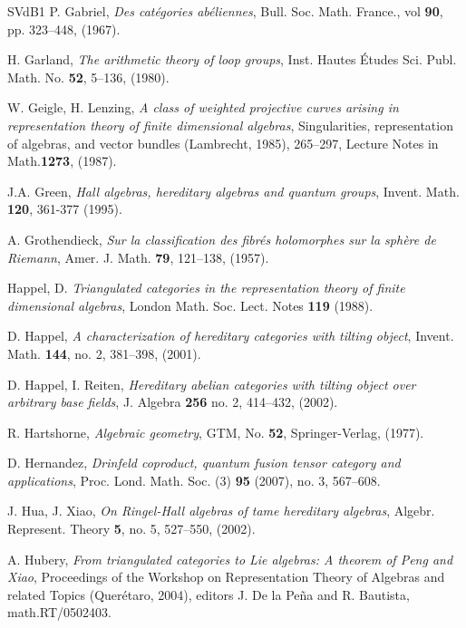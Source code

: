 \documentclass[a4paper,10pt]{amsart}
\numberwithin{equation}{section}
\begin{document}
{{\begin{thebibliography}{SVdB1}
P. Gabriel, \emph{Des cat\'egories ab\'eliennes}, Bull. Soc. Math. France., vol \textbf{90}, pp. 323--448, (1967).

H. Garland, \emph{The arithmetic theory of loop groups}, Inst. Hautes \'Etudes Sci. Publ. Math. No. \textbf{52}, 5--136, (1980).

W. Geigle, H. Lenzing, \emph{A class of weighted projective curves arising in representation theory of finite dimensional algebras}, Singularities, representation of algebras, and vector bundles (Lambrecht, 1985), 265--297, Lecture Notes in Math.\textbf{1273}, (1987).

J.A. Green, \emph{Hall algebras, hereditary algebras and quantum groups}, Invent. Math. \textbf{120}, 361-377 (1995).

A. Grothendieck, \emph{Sur la classification des fibr\'es holomorphes sur la sph\`ere de Riemann}, Amer. J. Math. \textbf{79}, 121--138, (1957).

Happel, D. \emph{Triangulated categories in the representation theory of
finite dimensional algebras}, London Math. Soc. Lect. Notes \textbf{119}
(1988).

D. Happel, \emph{A characterization of hereditary categories with tilting object},
Invent. Math. \textbf{144}, no. 2, 381--398, (2001).

D. Happel, I. Reiten, \emph{Hereditary abelian categories with tilting object over arbitrary base fields},
J. Algebra \textbf{256} no. 2, 414--432, (2002).

R. Hartshorne, \emph{Algebraic geometry},
GTM, No. \textbf{52}, Springer-Verlag, (1977).

D. Hernandez, \emph{Drinfeld coproduct, quantum fusion tensor category and applications}, Proc. Lond. Math. Soc. (3) \textbf{95} (2007), no. 3, 567--608.

J. Hua, J. Xiao, \emph{On Ringel-Hall algebras of tame hereditary algebras}, Algebr. Represent. Theory \textbf{5}, no. 5, 527--550, (2002).

A. Hubery, \emph{From triangulated categories to Lie algebras: A theorem of Peng and Xiao}, Proceedings of the Workshop on Representation Theory of Algebras and related Topics (Quer\'etaro, 2004), editors J. De la Pe\~na and R. Bautista, math.RT/0502403.


\end{thebibliography}}}
\end{document}
